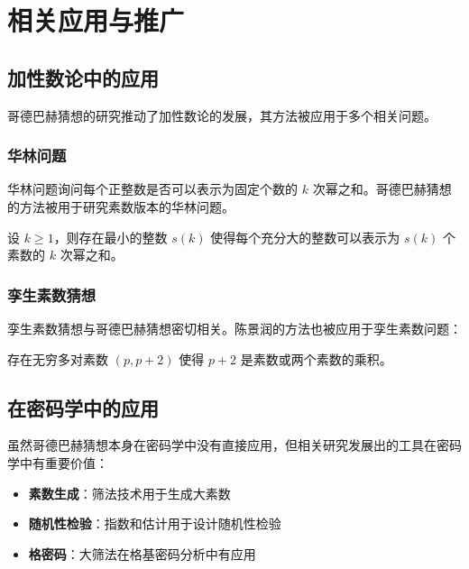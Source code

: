 \section{相关应用与推广}\label{sec:applications}

\subsection{加性数论中的应用}

哥德巴赫猜想的研究推动了加性数论的发展，其方法被应用于多个相关问题。

\subsubsection{华林问题}

华林问题询问每个正整数是否可以表示为固定个数的 $k$ 次幂之和\cite{nathanson1996additive}。哥德巴赫猜想的方法被用于研究素数版本的华林问题。

\begin{theorem}[华林-哥德巴赫问题]
    设 $k \geq 1$，则存在最小的整数 $s(k)$ 使得每个充分大的整数可以表示为 $s(k)$ 个素数的 $k$ 次幂之和。
\end{theorem}

\subsubsection{孪生素数猜想}

孪生素数猜想与哥德巴赫猜想密切相关。陈景润的方法也被应用于孪生素数问题：

\begin{theorem}
    存在无穷多对素数 $(p, p+2)$ 使得 $p+2$ 是素数或两个素数的乘积。
\end{theorem}

\subsection{在密码学中的应用}

虽然哥德巴赫猜想本身在密码学中没有直接应用，但相关研究发展出的工具在密码学中有重要价值：

\begin{itemize}
    \item \textbf{素数生成}：筛法技术用于生成大素数
    \item \textbf{随机性检验}：指数和估计用于设计随机性检验
    \item \textbf{格密码}：大筛法在格基密码分析中有应用
\end{itemize}

